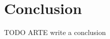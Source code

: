 \documentclass[10pt, a4paper, twocolumn]{article}
\begin{document}
\section{Conclusion}

TODO ARTE write a conclusion %





\end{document}

